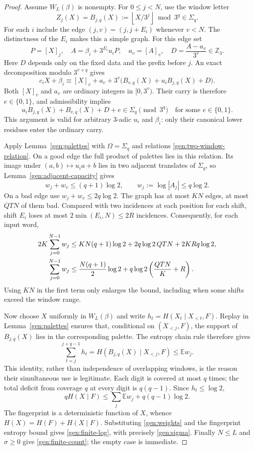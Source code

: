 \begin{proof}
Assume $W_L(\beta)$ is nonempty.  For $0\le j<N$, use the window
letter
\[
 Z_j(X)=B_{j,q}(X):=\left\lfloor X/3^j\right\rfloor\bmod3^q
                    \in\Sigma_q.
\]
For each $i$ include the edge $(j,v)=(j,j+E_i)$ whenever $v<N$.
The distinctness of the $E_i$ makes this a simple graph.  For this
edge set
\[
 P=[X]_j,\quad A=\beta_i+3^{E_i}u_iP,\quad
 a_v=[A]_v,\quad D=\frac{A-a_v}{3^v}\in\mathbb Z_3.
\]
Here $D$ depends only on the fixed data and the prefix before $j$.
An exact decomposition modulo $3^{v+q}$ gives
\[
 c_iX+\beta_i\equiv [X]_v+a_v+
          3^v\bigl(B_{v,q}(X)+u_iB_{j,q}(X)+D\bigr).
\]
Both $[X]_v$ and $a_v$ are ordinary integers in $[0,3^v)$.
Their carry is therefore $e\in\{0,1\}$, and admissibility implies
\begin{equation}\label{gen:two-window-relation}
 u_iB_{j,q}(X)+B_{v,q}(X)+D+e\in\Sigma_q\pmod{3^q}
                 \quad\text{for some }e\in\{0,1\}.
\end{equation}
This argument is valid for arbitrary $3$-adic $u_i$ and $\beta_i$:
only their canonical lower residues enter the ordinary carry.

Apply Lemma~\ref{gen:palettes} with $\Omega=\Sigma_q$ and relations
\eqref{gen:two-window-relation}.  On a good edge the full product
of palettes lies in this relation.  Its image under $(a,b)\mapsto
u_i a+b$ lies in two adjacent translates of $\Sigma_q$, so
Lemma~\ref{gen:adjacent-capacity} gives
\[
 w_j+w_v\le(q+1)\log2,
       \qquad w_j:=\log|A_j|\le q\log2.
\]
On a bad edge use $w_j+w_v\le2q\log2$.  The graph has at most
$KN$ edges, at most $QTN$ of them bad.  Compared with two incidences
at each position for each shift, shift $E_i$ loses at most
$2\min(E_i,N)\le2R$ incidences.  Consequently, for each input word,
\begin{align}
 2K\sum_{j=0}^{N-1}w_j
 &\le KN(q+1)\log2+2q\log2\,QTN+2KRq\log2,\notag\\
 \sum_{j=0}^{N-1}w_j
 &\le \frac{N(q+1)}2\log2
             +q\log2\left(\frac{QTN}{K}+R\right).
 \label{gen:weights}
\end{align}
Using $KN$ in the first term only enlarges the bound, including
when some shifts exceed the window range.

Now choose $X$ uniformly in $W_L(\beta)$ and write
$h_t=H(X_t\mid X_{<t},F)$.  Replay in
Lemma~\ref{gen:palettes} ensures that, conditional on $(X_{<j},F)$,
the support of $B_{j,q}(X)$ lies in the corresponding palette.
The entropy chain rule therefore gives
\[
 \sum_{t=j}^{j+q-1}h_t
 =H(B_{j,q}(X)\mid X_{<j},F)\le\mathbb E w_j.
\]
This identity, rather than independence of overlapping windows, is
the reason their simultaneous use is legitimate.  Each digit is
covered at most $q$ times; the total deficit from coverage $q$ at
every digit is $q(q-1)$.  Since $h_t\le\log2$,
\[
 qH(X\mid F)\le\sum_j\mathbb E w_j+q(q-1)\log2.
\]
The fingerprint is a deterministic function of $X$, whence
$H(X)=H(F)+H(X\mid F)$.  Substituting
\eqref{gen:weights} and the fingerprint entropy bound gives
\eqref{gen:finite-log}, with precisely \eqref{gen:sigma}.
Finally $N\le L$ and $\sigma\ge0$ give
\eqref{gen:finite-count}; the empty case is immediate.
\end{proof}

